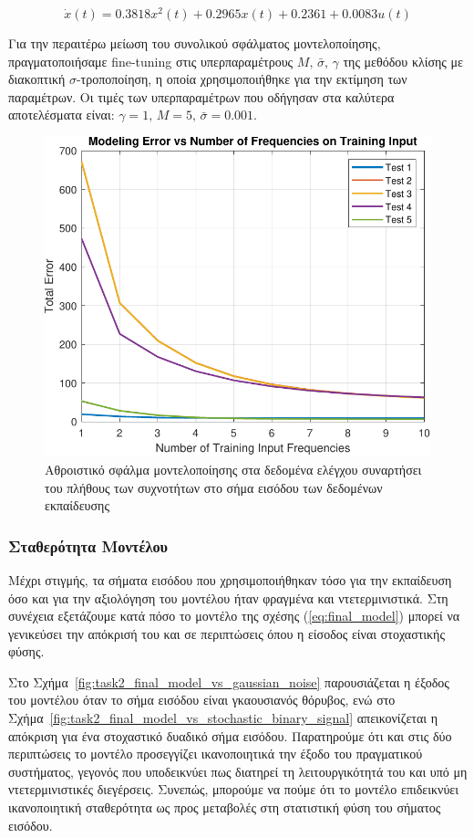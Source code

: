 \documentclass[a4paper,12pt]{article}
\begin{document}
\begin{equation}
    \dot{x}(t) = 0.3818 x^2(t) + 0.2965 x(t) + 0.2361 + 0.0083 u(t)
    \label{eq:final_model}
\end{equation}

Για την περαιτέρω μείωση του συνολικού σφάλματος μοντελοποίησης, πραγματοποιήσαμε 
fine-tuning στις υπερπαραμέτρους 
$M, \, \bar{\sigma}, \, \gamma$ της μεθόδου κλίσης με διακοπτική $\sigma$-τροποποίηση, 
η οποία χρησιμοποιήθηκε για την εκτίμηση των παραμέτρων. Οι τιμές των υπερπαραμέτρων που οδήγησαν 
στα καλύτερα αποτελέσματα είναι: $\gamma = 1, \, M = 5, \, \bar{\sigma} = 0.001$.

\begin{figure}
    \centering
    \includegraphics[width=0.5\linewidth]{plot/task2_error_vs_training_input_complexity.pdf}
    \caption{Αθροιστικό σφάλμα μοντελοποίησης στα δεδομένα ελέγχου συναρτήσει του πλήθους των συχνοτήτων 
    στο σήμα εισόδου των δεδομένων εκπαίδευσης}
    \label{fig:task2_error_vs_training_input_complexity}
\end{figure}

\subsubsection*{Σταθερότητα Μοντέλου}
Μέχρι στιγμής, τα σήματα εισόδου που χρησιμοποιήθηκαν τόσο για την εκπαίδευση όσο και για την αξιολόγηση του
μοντέλου ήταν φραγμένα και ντετερμινιστικά. Στη συνέχεια εξετάζουμε κατά πόσο το μοντέλο της 
σχέσης (\ref{eq:final_model}) μπορεί να γενικεύσει την απόκρισή του και σε περιπτώσεις όπου η είσοδος είναι 
στοχαστικής φύσης. 

Στο Σχήμα~\ref{fig:task2_final_model_vs_gaussian_noise} παρουσιάζεται η έξοδος του μοντέλου όταν το σήμα 
εισόδου είναι γκαουσιανός θόρυβος, ενώ στο Σχήμα~\ref{fig:task2_final_model_vs_stochastic_binary_signal} 
απεικονίζεται η απόκριση για ένα στοχαστικό δυαδικό σήμα εισόδου. Παρατηρούμε ότι και στις δύο περιπτώσεις 
το μοντέλο προσεγγίζει ικανοποιητικά την έξοδο του πραγματικού συστήματος, γεγονός που υποδεικνύει πως 
διατηρεί τη λειτουργικότητά του και υπό μη ντετερμινιστικές διεγέρσεις. Συνεπώς, μπορούμε να πούμε ότι το 
μοντέλο επιδεικνύει ικανοποιητική σταθερότητα ως προς μεταβολές στη στατιστική φύση του σήματος εισόδου.
\end{document}
